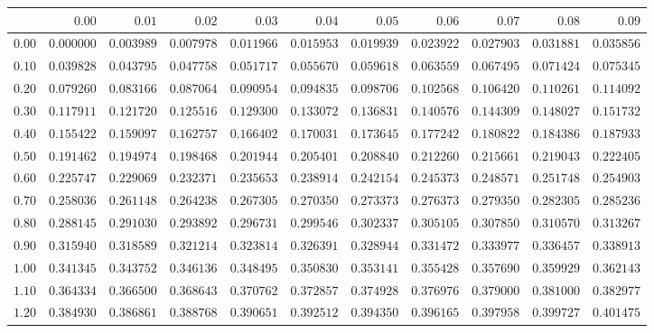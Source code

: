 \begin{tabular}{rrrrrrrrrrr}
  \hline
 & $0.00$ & $0.01$ & $0.02$ & $0.03$ & $0.04$ & $0.05$ & $0.06$ & $0.07$ & $0.08$ & $0.09$ \\ 
  \hline
$0.00$ & $0.000000$ & $0.003989$ & $0.007978$ & $0.011966$ & $0.015953$ & $0.019939$ & $0.023922$ & $0.027903$ & $0.031881$ & $0.035856$ \\ 
  $0.10$ & $0.039828$ & $0.043795$ & $0.047758$ & $0.051717$ & $0.055670$ & $0.059618$ & $0.063559$ & $0.067495$ & $0.071424$ & $0.075345$ \\ 
  $0.20$ & $0.079260$ & $0.083166$ & $0.087064$ & $0.090954$ & $0.094835$ & $0.098706$ & $0.102568$ & $0.106420$ & $0.110261$ & $0.114092$ \\ 
  $0.30$ & $0.117911$ & $0.121720$ & $0.125516$ & $0.129300$ & $0.133072$ & $0.136831$ & $0.140576$ & $0.144309$ & $0.148027$ & $0.151732$ \\ 
  $0.40$ & $0.155422$ & $0.159097$ & $0.162757$ & $0.166402$ & $0.170031$ & $0.173645$ & $0.177242$ & $0.180822$ & $0.184386$ & $0.187933$ \\ 
  $0.50$ & $0.191462$ & $0.194974$ & $0.198468$ & $0.201944$ & $0.205401$ & $0.208840$ & $0.212260$ & $0.215661$ & $0.219043$ & $0.222405$ \\ 
  $0.60$ & $0.225747$ & $0.229069$ & $0.232371$ & $0.235653$ & $0.238914$ & $0.242154$ & $0.245373$ & $0.248571$ & $0.251748$ & $0.254903$ \\ 
  $0.70$ & $0.258036$ & $0.261148$ & $0.264238$ & $0.267305$ & $0.270350$ & $0.273373$ & $0.276373$ & $0.279350$ & $0.282305$ & $0.285236$ \\ 
  $0.80$ & $0.288145$ & $0.291030$ & $0.293892$ & $0.296731$ & $0.299546$ & $0.302337$ & $0.305105$ & $0.307850$ & $0.310570$ & $0.313267$ \\ 
  $0.90$ & $0.315940$ & $0.318589$ & $0.321214$ & $0.323814$ & $0.326391$ & $0.328944$ & $0.331472$ & $0.333977$ & $0.336457$ & $0.338913$ \\ 
  $1.00$ & $0.341345$ & $0.343752$ & $0.346136$ & $0.348495$ & $0.350830$ & $0.353141$ & $0.355428$ & $0.357690$ & $0.359929$ & $0.362143$ \\ 
  $1.10$ & $0.364334$ & $0.366500$ & $0.368643$ & $0.370762$ & $0.372857$ & $0.374928$ & $0.376976$ & $0.379000$ & $0.381000$ & $0.382977$ \\ 
  $1.20$ & $0.384930$ & $0.386861$ & $0.388768$ & $0.390651$ & $0.392512$ & $0.394350$ & $0.396165$ & $0.397958$ & $0.399727$ & $0.401475$ \\ 

\end{tabular}
